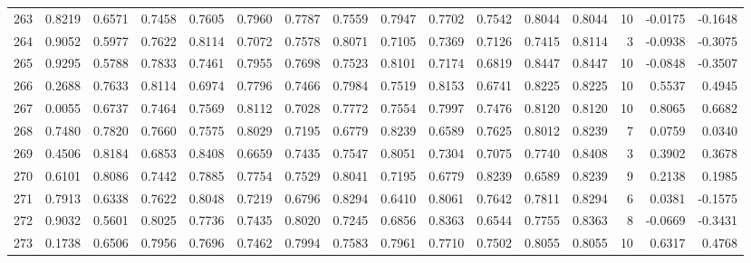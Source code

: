\begin{tabular}{lrrrrrrrrrrrrrrr}
263 &      0.8219 &  0.6571 &  0.7458 &  0.7605 &  0.7960 &  0.7787 &  0.7559 &  0.7947 &  0.7702 &  0.7542 &   0.8044 &     0.8044 &     10 &                   -0.0175 &                    -0.1648 \\
264 &      0.9052 &  0.5977 &  0.7622 &  0.8114 &  0.7072 &  0.7578 &  0.8071 &  0.7105 &  0.7369 &  0.7126 &   0.7415 &     0.8114 &      3 &                   -0.0938 &                    -0.3075 \\
265 &      0.9295 &  0.5788 &  0.7833 &  0.7461 &  0.7955 &  0.7698 &  0.7523 &  0.8101 &  0.7174 &  0.6819 &   0.8447 &     0.8447 &     10 &                   -0.0848 &                    -0.3507 \\
266 &      0.2688 &  0.7633 &  0.8114 &  0.6974 &  0.7796 &  0.7466 &  0.7984 &  0.7519 &  0.8153 &  0.6741 &   0.8225 &     0.8225 &     10 &                    0.5537 &                     0.4945 \\
267 &      0.0055 &  0.6737 &  0.7464 &  0.7569 &  0.8112 &  0.7028 &  0.7772 &  0.7554 &  0.7997 &  0.7476 &   0.8120 &     0.8120 &     10 &                    0.8065 &                     0.6682 \\
268 &      0.7480 &  0.7820 &  0.7660 &  0.7575 &  0.8029 &  0.7195 &  0.6779 &  0.8239 &  0.6589 &  0.7625 &   0.8012 &     0.8239 &      7 &                    0.0759 &                     0.0340 \\
269 &      0.4506 &  0.8184 &  0.6853 &  0.8408 &  0.6659 &  0.7435 &  0.7547 &  0.8051 &  0.7304 &  0.7075 &   0.7740 &     0.8408 &      3 &                    0.3902 &                     0.3678 \\
270 &      0.6101 &  0.8086 &  0.7442 &  0.7885 &  0.7754 &  0.7529 &  0.8041 &  0.7195 &  0.6779 &  0.8239 &   0.6589 &     0.8239 &      9 &                    0.2138 &                     0.1985 \\
271 &      0.7913 &  0.6338 &  0.7622 &  0.8048 &  0.7219 &  0.6796 &  0.8294 &  0.6410 &  0.8061 &  0.7642 &   0.7811 &     0.8294 &      6 &                    0.0381 &                    -0.1575 \\
272 &      0.9032 &  0.5601 &  0.8025 &  0.7736 &  0.7435 &  0.8020 &  0.7245 &  0.6856 &  0.8363 &  0.6544 &   0.7755 &     0.8363 &      8 &                   -0.0669 &                    -0.3431 \\
273 &      0.1738 &  0.6506 &  0.7956 &  0.7696 &  0.7462 &  0.7994 &  0.7583 &  0.7961 &  0.7710 &  0.7502 &   0.8055 &     0.8055 &     10 &                    0.6317 &                     0.4768 \\

\end{tabular}
